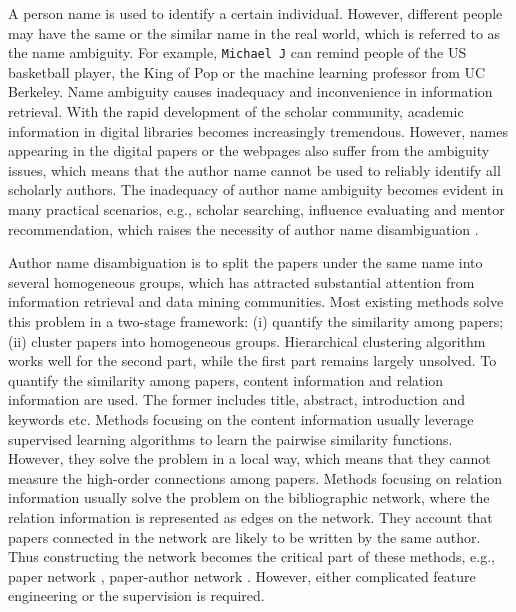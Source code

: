 \documentclass[letterpaper]{article} %
\begin{document}
A person name is used to identify a certain individual.
However, different people may have the same or the similar name in the real world, which is referred to as the name ambiguity.
For example, \texttt{Michael J} can remind people of the US basketball player, the King of Pop or the machine learning professor from UC Berkeley.
Name ambiguity causes inadequacy and inconvenience in information retrieval.
With the rapid development of the scholar community, academic information in digital libraries becomes increasingly tremendous.
However, names appearing in the digital papers or the webpages also suffer from the ambiguity issues, which means that the author name cannot be used to reliably identify all scholarly authors.
The inadequacy of author name ambiguity becomes evident in many practical scenarios, e.g., scholar searching, influence evaluating and mentor recommendation, which raises the necessity of author name disambiguation \cite{smalheiser2009author}.

Author name disambiguation is to split the papers under the same name into several homogeneous groups,
which has attracted substantial attention from information retrieval and data mining communities.
Most existing methods solve this problem in a two-stage framework:
(i) quantify the similarity among papers;
(ii) cluster papers into homogeneous groups.
Hierarchical clustering algorithm works well for the second part, while the first part remains largely unsolved.
To quantify the similarity among papers, content information and relation information are used.
The former includes title, abstract, introduction and keywords etc.
Methods focusing on the content information \cite{han:2014,Huang:2006,Yoshida:2010} usually leverage supervised learning algorithms to learn the pairwise similarity functions.
However, they solve the problem in a local way, which means that they cannot measure the high-order connections among papers.
Methods focusing on relation information \cite{Kanani:2007,Bekkerman:2005} usually solve the problem on the bibliographic network, where the relation information is represented as edges on the network.
They account that papers connected in the network are likely to be written by the same author.
Thus constructing the network becomes the critical part of these methods, e.g., paper network \cite{JieTang}, paper-author network \cite{Anonymized}.
However, either complicated feature engineering or the supervision \cite{JieTang} is required.
\end{document}
